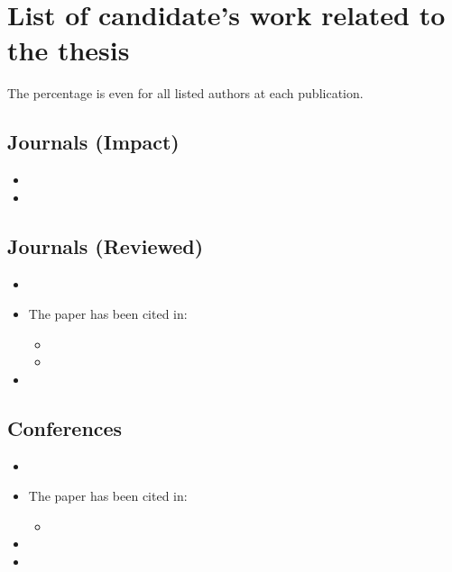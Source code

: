 \section*{List of candidate’s work related to the thesis}

The percentage is even for all listed authors at each publication.



\subsection*{Journals (Impact)}
\begin{itemize}
	\item {}
	\item {}
\end{itemize}

\subsection*{Journals (Reviewed)}
\begin{itemize}
	\item {}
	\item {}
	\vglue 1mm
	The paper has been cited in:	
	\begin{itemize}
		\item {}
		\item {}
	\end{itemize}	
	\item {}
\end{itemize}

\subsection*{Conferences}
\begin{itemize}
	\item {}
	\item {}
	\vglue 1mm
	The paper has been cited in:
	\begin{itemize}
		\item {}
	\end{itemize}
	\item {}
	\item {}
\end{itemize}

